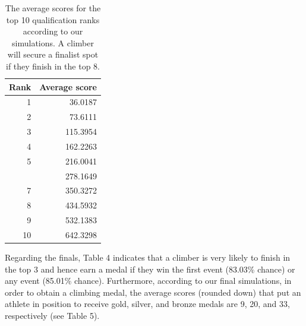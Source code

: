 \documentclass[12pt]{article}
\begin{document}
\begin{table}[H]

\caption{\label{tab:unnamed-chunk-8}The average scores for the top 10 qualification ranks according to our simulations. A climber will secure a finalist spot if they finish in the top 8.}
\centering
\begin{tabular}[t]{rr}
\toprule
Rank & Average score\\
\midrule
1 & 36.0187\\
2 & 73.6111\\
3 & 115.3954\\
4 & 162.2263\\
5 & 216.0041\\
\addlinespace
6 & 278.1649\\
7 & 350.3272\\
8 & 434.5932\\
9 & 532.1383\\
10 & 642.3298\\
\bottomrule
\end{tabular}
\end{table}

Regarding the finals, Table 4 indicates that a climber is very likely to
finish in the top 3 and hence earn a medal if they win the first event
(83.03\% chance) or any event (85.01\% chance). Furthermore, according
to our final simulations, in order to obtain a climbing medal, the
average scores (rounded down) that put an athlete in position to receive
gold, silver, and bronze medals are 9, 20, and 33, respectively (see
Table 5).
\end{document}
